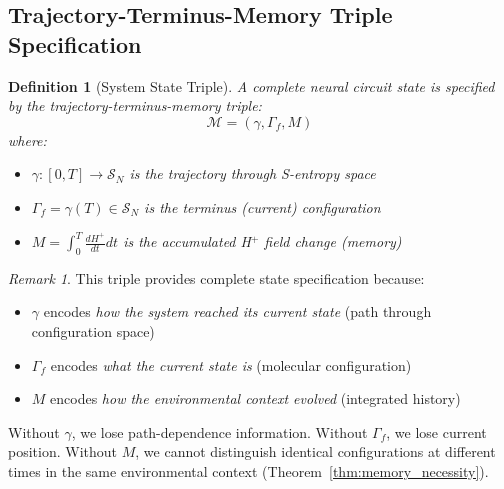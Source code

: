 \documentclass[aps,prd,twocolumn,superscriptaddress,floatfix,nofootinbib]{revtex4-2}
\newtheorem{definition}[theorem]{Definition}
\theoremstyle{remark}
\newtheorem{remark}[theorem]{Remark}
\begin{document}
\subsection{Trajectory-Terminus-Memory Triple Specification}

\begin{definition}[System State Triple]
\label{def:system_state_triple}
A complete neural circuit state is specified by the trajectory-terminus-memory triple:
\begin{equation}
\boxed{\mathcal{M} = (\gamma, \Gamma_f, M)}
\end{equation}
where:
\begin{itemize}
\item $\gamma: [0,T] \to \mathcal{S}_N$ is the trajectory through S-entropy space
\item $\Gamma_f = \gamma(T) \in \mathcal{S}_N$ is the terminus (current) configuration
\item $M = \int_0^T \frac{dH^+}{dt} dt$ is the accumulated H$^+$ field change (memory)
\end{itemize}
\end{definition}

\begin{remark}
This triple provides complete state specification because:
\begin{itemize}
\item $\gamma$ encodes \emph{how the system reached its current state} (path through configuration space)
\item $\Gamma_f$ encodes \emph{what the current state is} (molecular configuration)
\item $M$ encodes \emph{how the environmental context evolved} (integrated history)
\end{itemize}

Without $\gamma$, we lose path-dependence information. Without $\Gamma_f$, we lose current position. Without $M$, we cannot distinguish identical configurations at different times in the same environmental context (Theorem~\ref{thm:memory_necessity}).
\end{remark}
\end{document}
